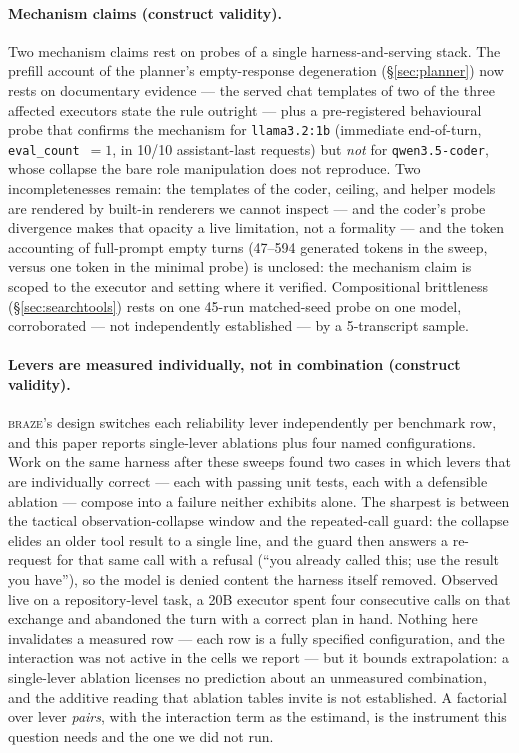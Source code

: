 \documentclass[smallcondensed,natbib]{svjour3}
\newcommand{\braze}{\textsc{braze}}
\begin{document}
\paragraph{Mechanism claims (construct validity).} Two mechanism
claims rest on probes of a single harness-and-serving stack. The
prefill account of the planner's empty-response degeneration
(\S\ref{sec:planner}) now rests on documentary evidence --- the served
chat templates of two of the three affected executors state the rule
outright --- plus a pre-registered behavioural probe that confirms the
mechanism for \texttt{llama3.2:1b} (immediate end-of-turn,
\texttt{eval\_count}~$=1$, in 10/10 assistant-last requests) but
\emph{not} for \texttt{qwen3.5-coder}, whose collapse the bare role
manipulation does not reproduce. Two incompletenesses remain: the
templates of the coder, ceiling, and helper models are rendered by
built-in renderers we cannot inspect --- and the coder's probe
divergence makes that opacity a live limitation, not a formality ---
and the token accounting of full-prompt empty turns (47--594 generated
tokens in the sweep, versus one token in the minimal probe) is
unclosed: the mechanism claim is scoped to the executor and setting
where it verified. Compositional brittleness
(\S\ref{sec:searchtools}) rests on one 45-run matched-seed probe on
one model, corroborated --- not independently established --- by a
5-transcript sample.

\paragraph{Levers are measured individually, not in combination
(construct validity).} \braze{}'s design switches each reliability
lever independently per benchmark row, and this paper reports
single-lever ablations plus four named configurations. Work on the same
harness after these sweeps found two cases in which levers that are
individually correct --- each with passing unit tests, each with a
defensible ablation --- compose into a failure neither exhibits alone.
The sharpest is between the tactical observation-collapse window and
the repeated-call guard: the collapse elides an older tool result to a
single line, and the guard then answers a re-request for that same call
with a refusal (``you already called this; use the result you have''),
so the model is denied content the harness itself removed. Observed
live on a repository-level task, a 20B executor spent four consecutive
calls on that exchange and abandoned the turn with a correct plan in
hand. Nothing here invalidates a measured row --- each row is a fully
specified configuration, and the interaction was not active in the
cells we report --- but it bounds extrapolation: a single-lever
ablation licenses no prediction about an unmeasured combination, and
the additive reading that ablation tables invite is not established. A
factorial over lever \emph{pairs}, with the interaction term as the
estimand, is the instrument this question needs and the one we did not
run.
\end{document}
